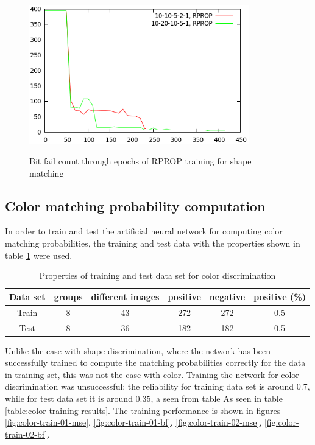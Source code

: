 \documentclass[times, utf8, zavrsni]{fer}
\begin{document}
\begin{figure}[htb]
\caption{Bit fail count through epochs of RPROP training for shape matching}
\centering
\includegraphics[width=0.85\textwidth]{images/shape-train02-bf}
\label{fig:shape-train-02-bf}
\end{figure}

\subsection{Color matching probability computation}

In order to train and test the artificial neural network for computing color
matching probabilities, the training and test data with the properties shown
in table \ref{table:color-data-properties} were used.


\begin{table}[h] \begin{center} {\footnotesize
\begin{tabular}{c|c|c|c|c|c}
Data set & groups & different images & positive & negative & positive (\%) \\
\hline
Train & 8 & 43 & 272 & 272 & 0.5 \\
Test & 8 & 36 & 182 & 182 & 0.5 \\
\end{tabular} }
\end{center}
\caption{\footnotesize Properties of training and test data set for color
discrimination}
\label{table:color-data-properties}
\end{table}

Unlike the case with shape discrimination, where the network has been
successfully trained to compute the matching probabilities correctly for the
data in training set, this was not the case with color. Training the network for
color discrimination was unsuccessful; the reliability for training data set
is around $0.7$, while for test data set it is around $0.35$, a seen from table
As seen in table \ref{table:color-training-results}. The training performance is shown in
figures \ref{fig:color-train-01-mse}, \ref{fig:color-train-01-bf}, 
\ref{fig:color-train-02-mse}, \ref{fig:color-train-02-bf}.
\end{document}
